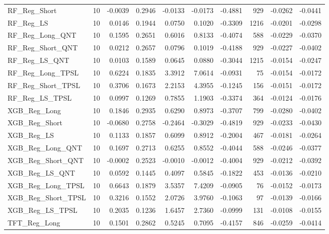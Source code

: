 \begin{tabular}{llrrrrrrrr}
\cline{1-10}
RF\_Reg\_Short & 10 & -0.0039 & 0.2946 & -0.0133 & -0.0173 & -0.4881 & 929 & -0.0262 & -0.0441 \\
\cline{1-10}
RF\_Reg\_LS & 10 & 0.0146 & 0.1944 & 0.0750 & 0.1020 & -0.3309 & 1216 & -0.0201 & -0.0298 \\
\cline{1-10}
RF\_Reg\_Long\_QNT & 10 & 0.1595 & 0.2651 & 0.6016 & 0.8133 & -0.4074 & 588 & -0.0229 & -0.0370 \\
\cline{1-10}
RF\_Reg\_Short\_QNT & 10 & 0.0212 & 0.2657 & 0.0796 & 0.1019 & -0.4188 & 929 & -0.0227 & -0.0402 \\
\cline{1-10}
RF\_Reg\_LS\_QNT & 10 & 0.0103 & 0.1589 & 0.0645 & 0.0880 & -0.3044 & 1215 & -0.0154 & -0.0247 \\
\cline{1-10}
RF\_Reg\_Long\_TPSL & 10 & 0.6224 & 0.1835 & 3.3912 & 7.0614 & -0.0931 & 75 & -0.0154 & -0.0172 \\
\cline{1-10}
RF\_Reg\_Short\_TPSL & 10 & 0.3706 & 0.1673 & 2.2153 & 4.3955 & -0.1245 & 156 & -0.0151 & -0.0172 \\
\cline{1-10}
RF\_Reg\_LS\_TPSL & 10 & 0.0997 & 0.1269 & 0.7855 & 1.1903 & -0.3374 & 364 & -0.0124 & -0.0176 \\
\cline{1-10}
XGB\_Reg\_Long & 10 & 0.1846 & 0.2935 & 0.6290 & 0.8973 & -0.3707 & 799 & -0.0280 & -0.0402 \\
\cline{1-10}
XGB\_Reg\_Short & 10 & -0.0680 & 0.2758 & -0.2464 & -0.3029 & -0.4819 & 929 & -0.0233 & -0.0430 \\
\cline{1-10}
XGB\_Reg\_LS & 10 & 0.1133 & 0.1857 & 0.6099 & 0.8912 & -0.2004 & 467 & -0.0181 & -0.0264 \\
\cline{1-10}
XGB\_Reg\_Long\_QNT & 10 & 0.1697 & 0.2713 & 0.6255 & 0.8552 & -0.4044 & 588 & -0.0246 & -0.0377 \\
\cline{1-10}
XGB\_Reg\_Short\_QNT & 10 & -0.0002 & 0.2523 & -0.0010 & -0.0012 & -0.4004 & 929 & -0.0212 & -0.0392 \\
\cline{1-10}
XGB\_Reg\_LS\_QNT & 10 & 0.0592 & 0.1445 & 0.4097 & 0.5845 & -0.1822 & 453 & -0.0136 & -0.0210 \\
\cline{1-10}
XGB\_Reg\_Long\_TPSL & 10 & 0.6643 & 0.1879 & 3.5357 & 7.4209 & -0.0905 & 76 & -0.0152 & -0.0173 \\
\cline{1-10}
XGB\_Reg\_Short\_TPSL & 10 & 0.3216 & 0.1552 & 2.0726 & 3.9760 & -0.1063 & 97 & -0.0139 & -0.0166 \\
\cline{1-10}
XGB\_Reg\_LS\_TPSL & 10 & 0.2035 & 0.1236 & 1.6457 & 2.7360 & -0.0999 & 131 & -0.0108 & -0.0155 \\
\cline{1-10}
TFT\_Reg\_Long & 10 & 0.1501 & 0.2862 & 0.5245 & 0.7095 & -0.4157 & 846 & -0.0259 & -0.0414 \\

\end{tabular}

